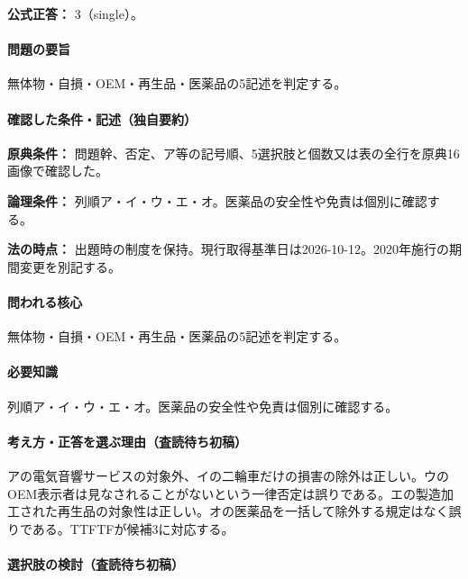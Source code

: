\textbf{公式正答：} 3（single）。

\paragraph{問題の要旨} 無体物・自損・OEM・再生品・医薬品の5記述を判定する。

\paragraph{確認した条件・記述（独自要約）}\mbox{}\par

\noindent\textbf{原典条件：} 問題幹、否定、ア等の記号順、5選択肢と個数又は表の全行を原典16画像で確認した。\par

\noindent\textbf{論理条件：} 列順ア・イ・ウ・エ・オ。医薬品の安全性や免責は個別に確認する。\par

\noindent\textbf{法の時点：} 出題時の制度を保持。現行取得基準日は2026-10-12。2020年施行の期間変更を別記する。\par

\paragraph{問われる核心} 無体物・自損・OEM・再生品・医薬品の5記述を判定する。

\paragraph{必要知識} 列順ア・イ・ウ・エ・オ。医薬品の安全性や免責は個別に確認する。

\paragraph{考え方・正答を選ぶ理由（査読待ち初稿）} アの電気音響サービスの対象外、イの二輪車だけの損害の除外は正しい。ウのOEM表示者は見なされることがないという一律否定は誤りである。エの製造加工された再生品の対象性は正しい。オの医薬品を一括して除外する規定はなく誤りである。TTFTFが候補3に対応する。

\paragraph{選択肢の検討（査読待ち初稿）}\mbox{}\par

